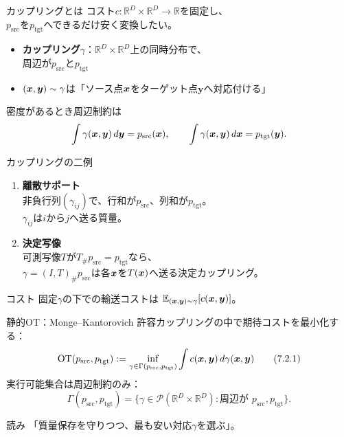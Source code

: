 \begin{frame}{カップリングとは}
    コスト$c:\mathbb{R}^{D}\times\mathbb{R}^{D}\to\mathbb{R}$を固定し、\\
    $p_{\mathrm{src}}$を$p_{\mathrm{tgt}}$へできるだけ安く変換したい。
    \begin{itemize}
        \item \textbf{カップリング}$\gamma$：$\mathbb{R}^{D}\times\mathbb{R}^{D}$上の同時分布で、\\
        周辺が$p_{\mathrm{src}}$と$p_{\mathrm{tgt}}$
        \item $(\bm{x},\bm{y})\sim\gamma$は「ソース点$\bm{x}$をターゲット点$\bm{y}$へ対応付ける」
    \end{itemize}
    密度があるとき周辺制約は
    \[
        \int \gamma(\bm{x},\bm{y})\,d\bm{y} = p_{\mathrm{src}}(\bm{x}),
        \qquad
        \int \gamma(\bm{x},\bm{y})\,d\bm{x} = p_{\mathrm{tgt}}(\bm{y}).
    \]
\end{frame}
\asmain
\begin{frame}{カップリングの二例}
    \begin{enumerate}
        \item \textbf{離散サポート}\\
        非負行列$(\gamma_{ij})$で、行和が$p_{\mathrm{src}}$、列和が$p_{\mathrm{tgt}}$。\\
        $\gamma_{ij}$は$i$から$j$へ送る質量。
        \item \textbf{決定写像}\\
        可測写像$T$が$T_{\#}p_{\mathrm{src}}=p_{\mathrm{tgt}}$なら、\\
        $\gamma=(I,T)_{\#}p_{\mathrm{src}}$は各$\bm{x}$を$T(\bm{x})$へ送る決定カップリング。
    \end{enumerate}
    \begin{exampleblock}{コスト}
        固定$\gamma$の下での輸送コストは
        $\mathbb{E}_{(\bm{x},\bm{y})\sim\gamma}[c(\bm{x},\bm{y})]$。
    \end{exampleblock}
\end{frame}
\asmain
\begin{frame}{静的OT：Monge--Kantorovich}
    許容カップリングの中で期待コストを最小化する：
    \[
        \mathrm{OT}(p_{\mathrm{src}},p_{\mathrm{tgt}})
        :=
        \inf_{\gamma\in\Gamma(p_{\mathrm{src}},p_{\mathrm{tgt}})}
        \int c(\bm{x},\bm{y})\,d\gamma(\bm{x},\bm{y})
        \tag{7.2.1}
    \]
    実行可能集合は周辺制約のみ：
    \[
        \Gamma(p_{\mathrm{src}},p_{\mathrm{tgt}})
        =
        \bigl\{\gamma\in\mathcal{P}(\mathbb{R}^{D}\times\mathbb{R}^{D}):
        \text{周辺が }p_{\mathrm{src}},p_{\mathrm{tgt}}\bigr\}.
    \]
    \begin{block}{読み}
        「質量保存を守りつつ、最も安い対応$\gamma$を選ぶ」。
    \end{block}
\end{frame}
